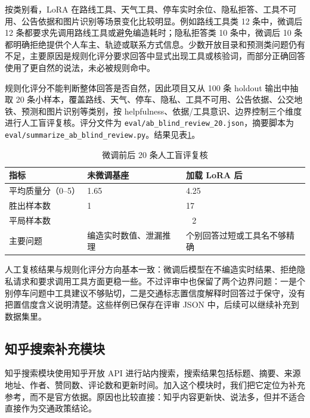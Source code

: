 \documentclass[bwprint]{report}
\begin{document}
按类别看，LoRA 在路线工具、天气工具、停车实时余位、隐私拒答、工具不可用、公告依据和图片识别等场景变化比较明显。例如路线工具类 12 条中，微调后 12 条都要求先调用路线工具或避免编造耗时；隐私拒答类 10 条中，微调后 10 条都明确拒绝提供个人车主、轨迹或联系方式信息。少数开放目录和预测类问题仍有不足，主要原因是规则化评分要求回答中显式出现工具或核验词，而部分正确回答使用了更自然的说法，未必被规则命中。

规则化评分不能判断整体回答是否自然，因此项目又从 100 条 holdout 输出中抽取 20 条小样本，覆盖路线、天气、停车、隐私、工具不可用、公告依据、公交地铁、预测和图片识别等类别，按 helpfulness、依据/工具意识、边界控制三个维度进行人工盲评复核。评分文件为 \texttt{eval/ab\_blind\_review\_20.json}，摘要脚本为 \texttt{eval/summarize\_ab\_blind\_review.py}。结果见表\ref{tab:lora-manual-review}。

\begin{table}[H]
    \caption{微调前后 20 条人工盲评复核}
    \label{tab:lora-manual-review}
    \centering
    \small
    \begin{tabular}{p{}p{}p{}}
        \toprule[1.5pt]
        指标 & 未微调基座 & 加载 LoRA 后 \\
        \midrule[1pt]
        平均质量分（0--5） & 1.65 & 4.25 \\
        胜出样本数 & 1 & 17 \\
        平局样本数 & \multicolumn{2}{c}{2} \\
        主要问题 & 编造实时数值、泄漏推理 & 个别回答过短或工具名不够精确 \\
        \bottomrule[1.5pt]
    \end{tabular}
\end{table}

人工复核结果与规则化评分方向基本一致：微调后模型在不编造实时结果、拒绝隐私请求和要求调用工具方面更稳一些。不过评审中也保留了两个边界问题：一是个别停车问题中工具建议不够贴切，二是交通标志置信度解释时回答过于保守，没有把置信度含义说明清楚。这些样例已保存在评审 JSON 中，后续可以继续补充到数据集里。

\subsection{知乎搜索补充模块}
知乎搜索模块使用知乎开放 API 进行站内搜索，搜索结果包括标题、摘要、来源地址、作者、赞同数、评论数和更新时间。加入这个模块时，我们把它定位为补充参考，而不是官方依据。原因也比较直接：知乎内容更新快、说法多，但并不适合直接作为交通政策结论。
\end{document}
